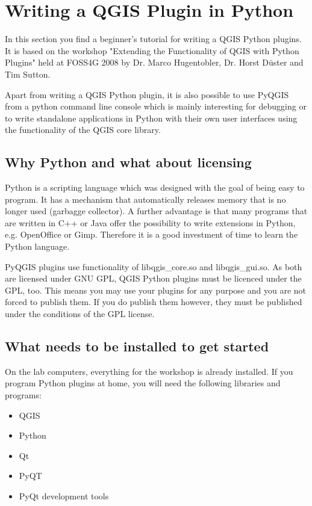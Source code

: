\section{Writing a QGIS Plugin in Python}

\updatedisclaimer

In this section you find a beginner's tutorial for writing a QGIS Python
plugins. It is based on the workshop "Extending the Functionality of QGIS
with Python Plugins" held at FOSS4G 2008 by Dr. Marco Hugentobler, Dr. Horst
D\"uster and Tim Sutton. 

Apart from writing a QGIS Python plugin, it is also possible to use PyQGIS
from a python command line console which is mainly interesting for debugging
or to write standalone applications in Python with their own user interfaces
using the functionality of the QGIS core library.

\subsection{Why Python and what about licensing}

Python is a scripting language which was designed with the goal of being easy
to program. It has a mechanism that automatically releases memory that is no
longer used (garbagge collector). A further advantage is that many programs
that are written in C++ or Java offer the possibility to write extensions in
Python, e.g. OpenOffice or Gimp. Therefore it is a good investment of time to
learn the Python language.

PyQGIS plugins use functionality of libqgis\_core.so and libqgis\_gui.so. As
both are licensed under GNU GPL, QGIS Python plugins must be licenced under the
GPL, too. This means you may use your plugins for any purpose and you are not
forced to publish them. If you do publish them however, they must be
published under the conditions of the GPL license. 

\subsection{What needs to be installed to get started}

On the lab computers, everything for the workshop is already installed. If
you program Python plugins at home, you will need the following libraries and
programs:

\begin{itemize}
\item QGIS
\item Python
\item Qt
\item PyQT
\item PyQt development tools
\end{itemize}

